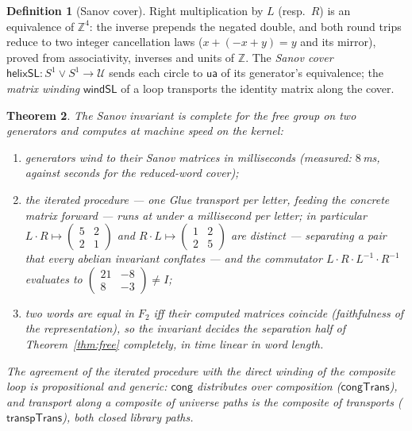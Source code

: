 \documentclass[11pt]{amsart}
\newtheorem{thm}{Theorem}[section]
\theoremstyle{definition}
\newtheorem{defi}[thm]{Definition}
\newcommand{\U}{\mathcal{U}}
\newcommand{\ua}{\mathsf{ua}}
\newcommand{\cng}{\mathsf{cong}}
\newcommand{\trns}{\mathbin{\cdot}}
\newcommand{\Ftwo}{F_2}
\newcommand{\Sone}{S^1}
\begin{document}
\begin{defi}[Sanov cover]
  \label{def:sanov}
  Right multiplication by $L$ (resp.\ $R$) is an equivalence of
  $\mathbb{Z}^4$: the inverse prepends the negated double, and both
  round trips reduce to two integer cancellation laws
  ($x + (-x + y) = y$ and its mirror), proved from associativity,
  inverses and units of $\mathbb{Z}$.  The \emph{Sanov cover}
  $\mathsf{helixSL} : \Sone \vee \Sone \to \U$ sends each circle to
  $\ua$ of its generator's equivalence; the \emph{matrix winding}
  $\mathsf{windSL}$ of a loop transports the identity matrix along
  the cover.
\end{defi}

\begin{thm}
  \label{thm:sanov}
  The Sanov invariant is complete for the free group on two
  generators and computes at machine speed on the kernel:
  \begin{enumerate}
  \item generators wind to their Sanov matrices in milliseconds
    (measured: $8\,$ms, against seconds for the reduced-word
    cover);
  \item the \emph{iterated} procedure --- one Glue transport per
    letter, feeding the concrete matrix forward --- runs at under a
    millisecond per letter; in particular
    $L\trns R \mapsto \left(\begin{smallmatrix}5&2\\2&1
    \end{smallmatrix}\right)$ and
    $R\trns L \mapsto \left(\begin{smallmatrix}1&2\\2&5
    \end{smallmatrix}\right)$ are distinct --- separating a pair
    that every abelian invariant conflates --- and the commutator
    $L\trns R\trns L^{-1}\trns R^{-1}$ evaluates to
    $\left(\begin{smallmatrix}21&-8\\8&-3\end{smallmatrix}\right)
    \neq I$;
  \item two words are equal in $\Ftwo$ iff their computed matrices
    coincide (faithfulness of the representation), so the invariant
    decides the separation half of Theorem~\ref{thm:free}
    completely, in time linear in word length.
  \end{enumerate}
  The agreement of the iterated procedure with the direct winding of
  the composite loop is propositional and generic: $\cng$
  distributes over composition
  ($\mathsf{congTrans}$), and transport along a composite of
  universe paths is the composite of transports
  ($\mathsf{transpTrans}$), both closed library paths.
\end{thm}
\end{document}
